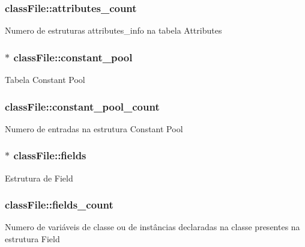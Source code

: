 \subsubsection[{\texorpdfstring{attributes\+\_\+count}{attributes_count}}]{ class\+File\+::attributes\+\_\+count}\hypertarget{structclassFile_a9c2f1bdfe0c43e7189f2a7100bec1966}{}\label{structclassFile_a9c2f1bdfe0c43e7189f2a7100bec1966}
Numero de estruturas attributes\+\_\+info na tabela Attributes 
\subsubsection[{\texorpdfstring{constant\+\_\+pool}{constant_pool}}]{$\ast$ class\+File\+::constant\+\_\+pool}\hypertarget{structclassFile_adb70ba83c3ffbcc26bffaff8185be813}{}\label{structclassFile_adb70ba83c3ffbcc26bffaff8185be813}
Tabela Constant Pool 
\subsubsection[{\texorpdfstring{constant\+\_\+pool\+\_\+count}{constant_pool_count}}]{ class\+File\+::constant\+\_\+pool\+\_\+count}\hypertarget{structclassFile_ac8f5b297483f2b3e9f02ff133f248b40}{}\label{structclassFile_ac8f5b297483f2b3e9f02ff133f248b40}
Numero de entradas na estrutura Constant Pool 
\subsubsection[{\texorpdfstring{fields}{fields}}]{$\ast$ class\+File\+::fields}\hypertarget{structclassFile_af08165230270046ef4f4dcc6fb8133ae}{}\label{structclassFile_af08165230270046ef4f4dcc6fb8133ae}
Estrutura de Field 
\subsubsection[{\texorpdfstring{fields\+\_\+count}{fields_count}}]{ class\+File\+::fields\+\_\+count}\hypertarget{structclassFile_aab140aacadd635ec42e6117d90f7363a}{}\label{structclassFile_aab140aacadd635ec42e6117d90f7363a}
Numero de variáveis de classe ou de instâncias declaradas na classe presentes na estrutura Field 
